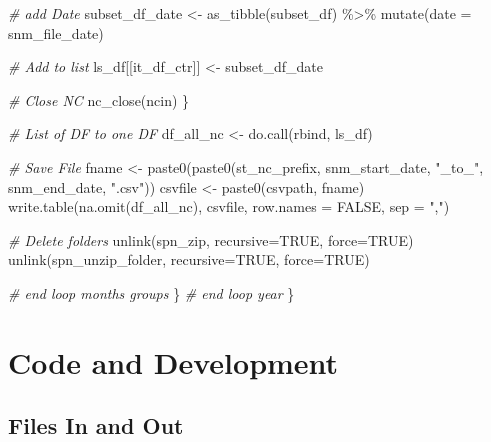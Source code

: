 \documentclass[
]{book}
\newenvironment{Shaded}{\begin{snugshade}}{\end{snugshade}}
\newcommand{\AttributeTok}[1]{\textcolor[rgb]{0.77,0.63,0.00}{#1}}
\newcommand{\CommentTok}[1]{\textcolor[rgb]{0.56,0.35,0.01}{\textit{#1}}}
\newcommand{\ConstantTok}[1]{\textcolor[rgb]{0.00,0.00,0.00}{#1}}
\newcommand{\FunctionTok}[1]{\textcolor[rgb]{0.00,0.00,0.00}{#1}}
\newcommand{\NormalTok}[1]{#1}
\newcommand{\OtherTok}[1]{\textcolor[rgb]{0.56,0.35,0.01}{#1}}
\newcommand{\SpecialCharTok}[1]{\textcolor[rgb]{0.00,0.00,0.00}{#1}}
\newcommand{\StringTok}[1]{\textcolor[rgb]{0.31,0.60,0.02}{#1}}
\begin{document}
\begin{Shaded}
\begin{Highlighting}[]
      \CommentTok{\# add Date}
\NormalTok{      subset\_df\_date }\OtherTok{\textless{}{-}} \FunctionTok{as\_tibble}\NormalTok{(subset\_df) }\SpecialCharTok{\%\textgreater{}\%} \FunctionTok{mutate}\NormalTok{(}\AttributeTok{date =}\NormalTok{ snm\_file\_date)}

      \CommentTok{\# Add to list}
\NormalTok{      ls\_df[[it\_df\_ctr]] }\OtherTok{\textless{}{-}}\NormalTok{ subset\_df\_date}

      \CommentTok{\# Close NC}
      \FunctionTok{nc\_close}\NormalTok{(ncin)}
\NormalTok{    \}}

    \CommentTok{\# List of DF to one DF}
\NormalTok{    df\_all\_nc }\OtherTok{\textless{}{-}} \FunctionTok{do.call}\NormalTok{(rbind, ls\_df)}

    \CommentTok{\# Save File}
\NormalTok{    fname }\OtherTok{\textless{}{-}} \FunctionTok{paste0}\NormalTok{(}\FunctionTok{paste0}\NormalTok{(st\_nc\_prefix,}
\NormalTok{                           snm\_start\_date, }\StringTok{"\_to\_"}\NormalTok{, snm\_end\_date,}
                           \StringTok{".csv"}\NormalTok{))}
\NormalTok{    csvfile }\OtherTok{\textless{}{-}} \FunctionTok{paste0}\NormalTok{(csvpath, fname)}
    \FunctionTok{write.table}\NormalTok{(}\FunctionTok{na.omit}\NormalTok{(df\_all\_nc), csvfile, }\AttributeTok{row.names =} \ConstantTok{FALSE}\NormalTok{, }\AttributeTok{sep =} \StringTok{","}\NormalTok{)}

    \CommentTok{\# Delete folders}
    \FunctionTok{unlink}\NormalTok{(spn\_zip, }\AttributeTok{recursive=}\ConstantTok{TRUE}\NormalTok{, }\AttributeTok{force=}\ConstantTok{TRUE}\NormalTok{)}
    \FunctionTok{unlink}\NormalTok{(spn\_unzip\_folder, }\AttributeTok{recursive=}\ConstantTok{TRUE}\NormalTok{, }\AttributeTok{force=}\ConstantTok{TRUE}\NormalTok{)}

  \CommentTok{\# end loop months groups}
\NormalTok{  \}}
\CommentTok{\# end loop year}
\NormalTok{\}}
\end{Highlighting}
\end{Shaded}

\hypertarget{code-and-development}{%
\chapter{Code and Development}\label{code-and-development}}

\hypertarget{files-in-and-out}{%
\section{Files In and Out}\label{files-in-and-out}}
\end{document}
